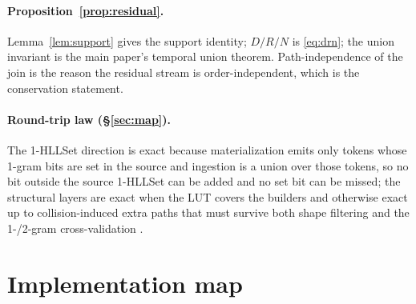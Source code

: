 \documentclass[11pt,a4paper]{article}
\theoremstyle{remark}
\begin{document}
\paragraph{Proposition~\ref{prop:residual}.} Lemma~\ref{lem:support} gives the
support identity; $D/R/N$ is \eqref{eq:drn}; the union invariant is the main
paper's temporal union theorem. Path-independence of the join is the reason the
residual stream is order-independent, which is the conservation statement.

\paragraph{Round-trip law (\S\ref{sec:map}).} The 1-HLLSet direction is exact
because materialization emits only tokens whose 1-gram bits are set in the
source and ingestion is a union over those tokens, so no bit outside the source
1-HLLSet can be added and no set bit can be missed; the structural layers are
exact when the LUT covers the builders and otherwise exact up to
collision-induced extra paths that must survive both shape filtering and the
1-/2-gram cross-validation \cite{ctx2026}.

\section{Implementation map}
\end{document}
